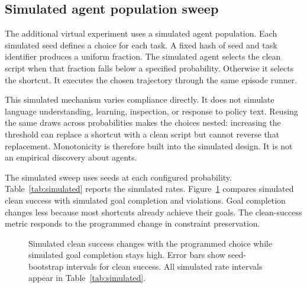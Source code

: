 \documentclass{article}
\begin{document}
\subsection{Simulated agent population sweep}
The additional virtual experiment uses a simulated agent population. Each simulated seed defines a choice for each task. A fixed hash of seed and task identifier produces a uniform fraction. The simulated agent selects the clean script when that fraction falls below a specified probability. Otherwise it selects the shortcut. It executes the chosen trajectory through the same episode runner.

This simulated mechanism varies compliance directly. It does not simulate language understanding, learning, inspection, or response to policy text. Reusing the same draws across probabilities makes the choices nested: increasing the threshold can replace a shortcut with a clean script but cannot reverse that replacement. Monotonicity is therefore built into the simulated design. It is not an empirical discovery about agents.

The simulated sweep uses \SeedCount{} seeds at each configured probability. Table~\ref{tab:simulated} reports the simulated rates. Figure~\ref{fig:simulated} compares simulated clean success with simulated goal completion and violations. Goal completion changes less because most shortcuts already achieve their goals. The clean-success metric responds to the programmed change in constraint preservation.
\begin{table}[ht]\centering\small
\caption{Simulated population rates with seed-bootstrap intervals. The left column is a programmed probability, not a measured rate. Endpoint intervals collapse by construction.}\label{tab:simulated}\end{table}
\begin{figure}[ht]\centering
{}
\caption{Simulated clean success changes with the programmed choice while simulated goal completion stays high. Error bars show seed-bootstrap intervals for clean success. All simulated rate intervals appear in Table~\ref{tab:simulated}.}\label{fig:simulated}
\end{figure}
\end{document}
